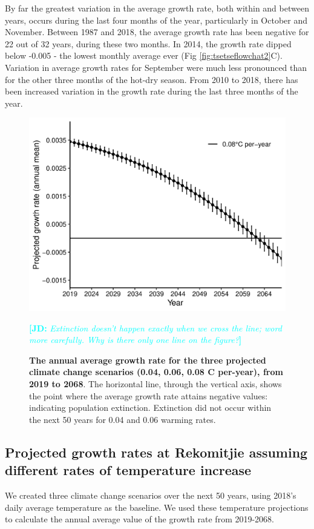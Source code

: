 \documentclass[12pt,a4paper]{article}
\newcommand{\comment}[3]{\textcolor{#1}{\textbf{[#2: }\textsl{#3}\textbf{]}}}
\newcommand{\jd}[1]{\comment{cyan}{JD}{#1}}
\begin{document}
\newpage

By far the greatest variation in the average growth rate, both within and between years, occurs during the last four months of the year, particularly in October and November. Between 1987 and 2018, the average growth rate has been negative for 22  out of 32 years, during these two months. In 2014, the growth rate dipped below -0.005 - the lowest monthly average ever (Fig \ref{fig:tsetseflowchat2}C). Variation in average growth rates for September were much less pronounced than for the other three months of the hot-dry season. From 2010 to 2018, there has been increased variation in the growth rate during the last three months of the year. 

\begin{figure}[h]
	\centering
	\includegraphics[width=0.8\linewidth]{ProjectionwithErrBar}
\caption{{\bf The annual average growth rate for the three projected climate change scenarios (0.04, 0.06, 0.08 \degree C per-year), from 2019 to 2068}. The horizontal line, through the vertical axis, shows the point where the average growth rate attains negative values: indicating population extinction. Extinction did not occur within the next 50 years for 0.04 and 0.06 warming rates.} \jd{Extinction doesn't happen exactly when we cross the line; word more carefully. Why is there only one line on the figure?}
	\label{fig:tsetseflowchat4}
\end{figure}



\subsection*{Projected growth rates at Rekomitjie assuming different rates of temperature increase}
We created three climate change scenarios over the next 50 years, using 2018's daily average temperature as the baseline. We used these temperature projections to calculate the annual average value of the growth rate from 2019-2068.
\end{document}
